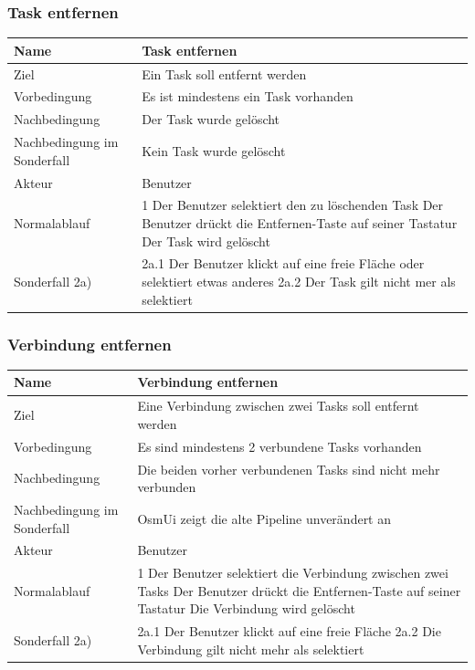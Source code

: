 \documentclass[a4paper,12pt]{scrartcl}
\begin{document}
\subsubsection{Task entfernen}
\begin{center}
\begin{tabular}{|p{5cm}|p{10cm}|}
\hline Name & \textbf{Task entfernen} \\ 
\hline Ziel & Ein Task soll entfernt werden \\ 
\hline Vorbedingung & Es ist mindestens ein Task vorhanden \\ 
\hline Nachbedingung & Der Task wurde gelöscht \\ 
\hline Nachbedingung im Sonderfall & Kein Task wurde gelöscht \\ 
\hline Akteur & Benutzer \\ 
\hline Normalablauf & 1 Der Benutzer selektiert den zu löschenden Task
\newline 2 Der Benutzer drückt die Entfernen-Taste auf seiner Tastatur
\newline 3 Der Task wird gelöscht\\ 
\hline Sonderfall 2a) & 2a.1 Der Benutzer klickt auf eine freie Fläche oder selektiert etwas anderes
\newline 2a.2 Der Task gilt nicht mer als selektiert\\
\hline 
\end{tabular}  
\end{center}
\subsubsection{Verbindung entfernen}
\begin{center}
\begin{tabular}{|p{5cm}|p{10cm}|}
\hline Name & \textbf{Verbindung entfernen} \\ 
\hline Ziel & Eine Verbindung zwischen zwei Tasks soll entfernt werden \\ 
\hline Vorbedingung & Es sind mindestens 2 verbundene Tasks vorhanden \\ 
\hline Nachbedingung &  Die beiden vorher verbundenen Tasks sind nicht mehr verbunden\\ 
\hline Nachbedingung im Sonderfall & OsmUi zeigt die alte Pipeline unverändert an \\ 
\hline Akteur & Benutzer \\ 
\hline Normalablauf & 1 Der Benutzer selektiert die Verbindung zwischen zwei Tasks
\newline 2 Der Benutzer drückt die Entfernen-Taste auf seiner Tastatur
\newline 3 Die Verbindung wird gelöscht\\ 
\hline Sonderfall 2a) & 2a.1 Der Benutzer klickt auf eine freie Fläche
\newline 2a.2 Die Verbindung gilt nicht mehr als selektiert\\
\hline 
\end{tabular}  
\end{center}
\end{document}
